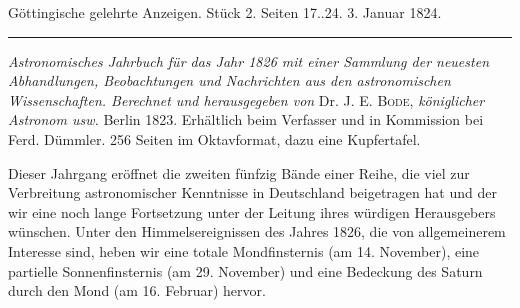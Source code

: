 \clearpage
{}
\hypertarget{native-635-lower}{}
\begin{center}\small Göttingische gelehrte Anzeigen. Stück 2. Seiten 17..24. 3. Januar 1824.\\[3pt]\rule{.72\linewidth}{.3pt}\end{center}

\emph{Astronomisches Jahrbuch für das Jahr \textup{1826} mit einer Sammlung der neuesten Abhandlungen, Beobachtungen und Nachrichten aus den astronomischen Wissenschaften. Berechnet und herausgegeben von} Dr. J. E. \textsc{Bode}, \emph{königlicher Astronom usw.} Berlin 1823. Erhältlich beim Verfasser und in Kommission bei Ferd. Dümmler. 256 Seiten im Oktavformat, dazu eine Kupfertafel.

Dieser Jahrgang eröffnet die zweiten fünfzig Bände einer Reihe, die viel zur Verbreitung astronomischer Kenntnisse in Deutschland beigetragen hat und der wir eine noch lange Fortsetzung  unter der Leitung ihres würdigen Herausgebers wünschen. Unter den Himmelsereignissen des Jahres 1826, die von allgemeinerem Interesse sind, heben wir eine totale Mondfinsternis (am 14. November), eine partielle Sonnenfinsternis (am 29. November) und eine Bedeckung des Saturn durch den Mond (am 16. Februar) hervor.

